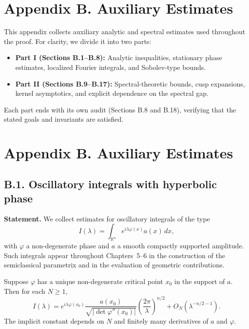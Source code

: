 \section*{Appendix B. Auxiliary Estimates}

This appendix collects auxiliary analytic and spectral estimates used throughout the proof.
For clarity, we divide it into two parts:

\begin{itemize}
  \item \textbf{Part I (Sections B.1--B.8):} Analytic inequalities, stationary phase estimates,
        localized Fourier integrals, and Sobolev-type bounds.
  \item \textbf{Part II (Sections B.9--B.17):} Spectral-theoretic bounds, cusp expansions,
        kernel asymptotics, and explicit dependence on the spectral gap.
\end{itemize}

Each part ends with its own audit (Sections B.8 and B.18), verifying that the stated
goals and invariants are satisfied.

\section*{Appendix B. Auxiliary Estimates}

\subsection*{B.1. Oscillatory integrals with hyperbolic phase}

\noindent
\textbf{Statement.}
We collect estimates for oscillatory integrals of the type
\[
I(\lambda) = \int_{\mathbb R^n} e^{i\lambda\varphi(x)} a(x)\,dx,
\]
with $\varphi$ a non-degenerate phase and $a$ a smooth compactly supported
amplitude. Such integrals appear throughout Chapters~5--6 in the construction
of the semiclassical parametrix and in the evaluation of geometric contributions.

\begin{lemma}\label{lem:stationary}
Suppose $\varphi$ has a unique non-degenerate critical point $x_0$ in the
support of $a$. Then for each $N\ge 1$,
\[
I(\lambda) = e^{i\lambda \varphi(x_0)} \frac{a(x_0)}{\sqrt{|\det \varphi''(x_0)|}}
\left(\frac{2\pi}{\lambda}\right)^{n/2}
+ O_N(\lambda^{-n/2-1}).
\]
The implicit constant depends on $N$ and finitely many derivatives of $a$ and
$\varphi$.
\end{lemma}

